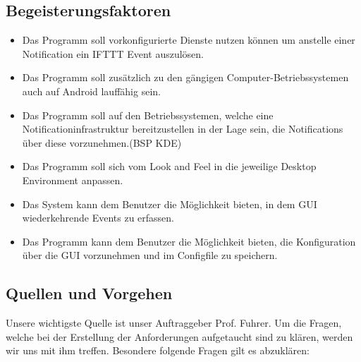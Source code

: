\documentclass[11pt,titelpage]{scrartcl}
\begin{document}
\subsection{Begeisterungsfaktoren}


\begin{itemize}
\item
Das Programm soll vorkonfigurierte Dienste nutzen können um anstelle einer Notification  ein IFTTT Event auszulösen.

\item
Das Programm soll zusätzlich zu den gängigen Computer-Betriebssystemen auch auf Android lauffähig sein.


\item
Das Programm soll auf den Betriebssystemen, welche eine Notificationinfrastruktur bereitzustellen in der Lage sein, die
Notifications über diese vorzunehmen.(BSP KDE)

\item
Das Programm soll sich vom Look and Feel in die jeweilige Desktop Environment anpassen.
\item
Das System kann dem Benutzer die Möglichkeit bieten, in dem GUI wiederkehrende Events zu erfassen.
\item
Das Programm kann dem Benutzer die Möglichkeit bieten, die Konfiguration über die GUI vorzunehmen und im Configfile zu
speichern.

\end{itemize}






\subsection{Quellen und Vorgehen}
Unsere wichtigste Quelle ist unser Auftraggeber Prof. Fuhrer. Um die Fragen, welche bei der Erstellung der
Anforderungen aufgetaucht sind zu klären, werden wir uns mit ihm treffen. Besondere folgende Fragen gilt es abzuklären:
\end{document}
